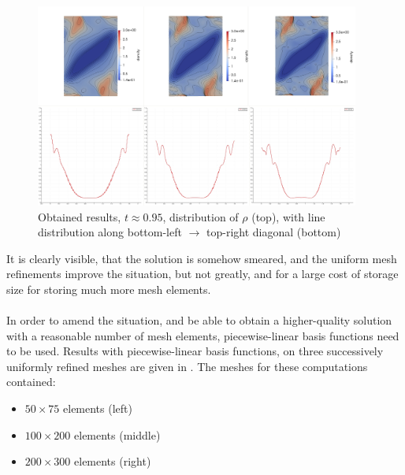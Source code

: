 \begin{figure}[H]
	\begin{center}
		\includegraphics[width=0.95\textwidth]{img/mhd-blast/new/blast,noadapt18.jpg}
	\caption{Obtained results, $t \approx 0.95$, distribution of $\rho$ (top), with line distribution along bottom-left $\rightarrow$ top-right diagonal (bottom)}
	\label{figure:blastNew06}
	\end{center}
\end{figure}
\vspace{-8mm}

It is clearly visible, that the solution is somehow smeared, and the uniform mesh refinements improve the situation, but not greatly, and for a large cost of storage size for storing much more mesh elements.
\paragraph{}
In order to amend the situation, and be able to obtain a higher-quality solution with a reasonable number of mesh elements, piecewise-linear basis functions need to be used. Results with piecewise-linear basis functions, on three successively uniformly refined meshes are given in . The meshes for these computations contained:
\begin{itemize}
\item $50 \times 75$ elements (left)
\item $100 \times 200$ elements (middle)
\item $200 \times 300$ elements (right)
\end{itemize}

